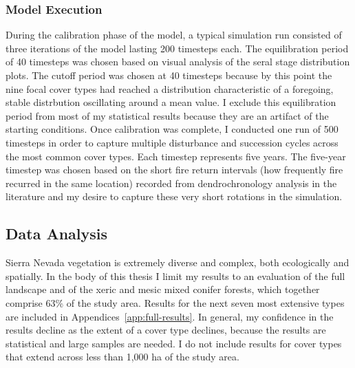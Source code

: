 


\subsubsection*{Model Execution}
During the calibration phase of the model, a typical simulation run consisted of three iterations of the model lasting 200 timesteps each. The equilibration period of 40 timesteps was chosen based on visual analysis of the seral stage distribution plots. The cutoff period was chosen at 40 timesteps because by this point the nine focal cover types had reached a distribution characteristic of a foregoing, stable distrbution oscillating around a mean value. I exclude this equilibration period from most of my statistical results because they are an artifact of the starting conditions. Once calibration was complete, I conducted one run of 500 timesteps in order to capture multiple disturbance and succession cycles across the most common cover types. Each timestep represents five years. The five-year timestep was chosen based on the short fire return intervals (how frequently fire recurred in the same location) recorded from dendrochronology analysis in the literature and my desire to capture these very short rotations in the simulation.

\subsection{Data Analysis}
\label{subsec:dataanalysis}

Sierra Nevada vegetation is extremely diverse and complex, both ecologically and spatially. In the body of this thesis I limit my results to an evaluation of the full landscape and of the xeric and mesic mixed conifer forests, which together comprise 63\% of the study area. Results for the next seven most extensive types are included in Appendices~\ref{app:full-results}. In general, my confidence in the results decline as the extent of a cover type declines, because the results are statistical and large samples are needed. I do not include results for cover types that extend across less than 1,000 ha of the study area.

